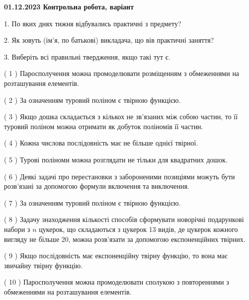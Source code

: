 \documentclass[12pt, ukrainian]{article}
\begin{document}
\vspace{4mm}
\newpage
\begin {large}

\textbf{01.12.2023 Контрольна робота, варіант  }\par


{
1. По яких днях тижня відбувались практичні з предмету?



\vspace{5mm}
2. Як зовуть (ім'я, по батькові) викладача, що вів практичні заняття?



\vspace{5mm}
3. Виберіть всі правильні твердження, якщо такі тут є.\par
\vspace{2mm}
( 1 ) Паросполучення можна промоделювати розміщенням з обмеженнями на розташування елементів.%

( 2 ) За означенням туровий поліном є твірною функцією.%

( 3 ) Якщо дошка складається з кількох не зв’язаних між собою частин, то її туровий поліном можна отримати як добуток поліномів її частин.%

( 4 ) Кожна числова послідовність має не більше однієї твірної.%

( 5 ) Турові поліноми можна розглядати не тільки для квадратних дошок.%

( 6 ) Деякі задачі про перестановки з забороненими позиціями можуть бути розв’я\-за\-ні за допомогою формули включення та виключення.%

( 7 ) За означенням туровий поліном є твірною функцією.%

( 8 ) Задачу знаходження кількості способів сформувати новорічні подарункові набори з $n$ цукерок, що складаються з цукерок 13 видів, де цукерок кожного вигляду не більше 20, можна розв’язати за допомогою експоненційних твірних.%

( 9 ) Якщо послідовність має експоненційну твірну функцію, то вона має звичайну твірну функцію.%

( 10 ) Паросполучення можна промоделювати сполукою з повтореннями з обмеженнями на розташування елементів.%
}
\end {large}
\end{document}
